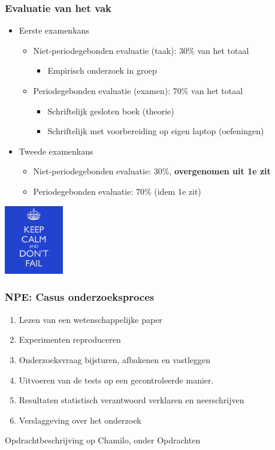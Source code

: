 \documentclass{beamer}
\begin{document}
\begin{frame}
  \frametitle{Evaluatie van het vak}

  \begin{itemize}
    \item Eerste examenkans
      \begin{itemize}
        \item Niet-periodegebonden evaluatie (taak): 30\% van het totaal
          \begin{itemize}
            \item Empirisch onderzoek in groep
          \end{itemize}
        \item Periodegebonden evaluatie (examen): 70\% van het totaal
        \begin{itemize}
          \item Schriftelijk gesloten boek (theorie)
          \item Schriftelijk met voorbereiding op eigen laptop (oefeningen)
        \end{itemize}
      \end{itemize}
    \item Tweede examenkans
      \begin{itemize}
        \item Niet-periodegebonden evaluatie: 30\%, \textbf{overgenomen uit 1e zit}
        \item Periodegebonden evaluatie: 70\% (idem 1e zit)
      \end{itemize}
  \end{itemize}

  \begin{center}
    \includegraphics[height=3cm]{img/intro-07}
  \end{center}
\end{frame}

\begin{frame}
  \frametitle{NPE: Casus onderzoeksproces}


  \begin{enumerate}
    \item Lezen van een wetenschappelijke paper
    \item Experimenten reproduceren
    \item Onderzoeksvraag bijsturen, afbakenen en vastleggen
    \item Uitvoeren van de tests op een gecontroleerde manier.
    \item Resultaten statistisch verantwoord verklaren en neerschrijven
    \item Verslaggeving over het onderzoek
  \end{enumerate}

  Opdrachtbeschrijving op Chamilo, onder Opdrachten
\end{frame}

\end{document}

